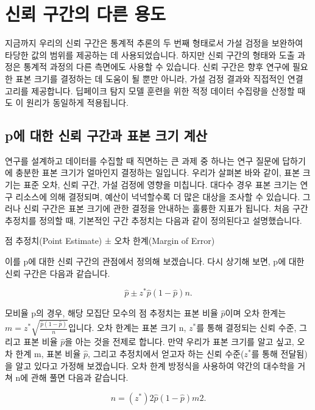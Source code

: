 \documentclass[
]{scrbook}
\begin{document}
\section{신뢰 구간의 다른
용도}\label{uxc2e0uxb8b0-uxad6cuxac04uxc758-uxb2e4uxb978-uxc6a9uxb3c4}

지금까지 우리의 신뢰 구간은 통계적 추론의 두 번째 형태로서 가설 검정을
보완하여 타당한 값의 범위를 제공하는 데 사용되었습니다. 하지만 신뢰
구간의 형태와 도출 과정은 통계적 과정의 다른 측면에도 사용할 수
있습니다. 신뢰 구간은 향후 연구에 필요한 표본 크기를 결정하는 데 도움이
될 뿐만 아니라, 가설 검정 결과와 직접적인 연결 고리를 제공합니다.
딥페이크 탐지 모델 훈련을 위한 적정 데이터 수집량을 산정할 때도 이
원리가 동일하게 적용됩니다.

\subsection{p에 대한 신뢰 구간과 표본 크기
계산}\label{puxc5d0-uxb300uxd55c-uxc2e0uxb8b0-uxad6cuxac04uxacfc-uxd45cuxbcf8-uxd06cuxae30-uxacc4uxc0b0}

연구를 설계하고 데이터를 수집할 때 직면하는 큰 과제 중 하나는 연구
질문에 답하기에 충분한 표본 크기가 얼마인지 결정하는 일입니다. 우리가
살펴본 바와 같이, 표본 크기는 표준 오차, 신뢰 구간, 가설 검정에 영향을
미칩니다. 대다수 경우 표본 크기는 연구 리소스에 의해 결정되며, 예산이
넉넉할수록 더 많은 대상을 조사할 수 있습니다. 그러나 신뢰 구간은 표본
크기에 관한 결정을 안내하는 훌륭한 지표가 됩니다. 처음 구간 추정치를
정의할 때, 기본적인 구간 추정치는 다음과 같이 정의된다고 설명했습니다.

점 추정치(Point Estimate) ± 오차 한계(Margin of Error)

이를 p에 대한 신뢰 구간의 관점에서 정의해 보겠습니다. 다시 상기해 보면,
p에 대한 신뢰 구간은 다음과 같습니다.

\[
\hat{p}±z^*\hat{p}(1-\hat{p})n.
\]

모비율 p의 경우, 해당 모집단 모수의 점 추정치는 표본 비율
\(\hat{p}\)이며 오차 한계는
\(m = z^* \sqrt{\frac{\hat{p}(1-\hat{p})}{n}}\)입니다. 오차 한계는 표본
크기 n, \(z^*\)를 통해 결정되는 신뢰 수준, 그리고 표본 비율
\(\hat{p}\)을 아는 것을 전제로 합니다. 만약 우리가 표본 크기를 알고
싶고, 오차 한계 m, 표본 비율 \(\hat{p}\), 그리고 추정치에서 얻고자 하는
신뢰 수준(\(z^*\)를 통해 전달됨)을 알고 있다고 가정해 보겠습니다. 오차
한계 방정식을 사용하여 약간의 대수학을 거쳐 n에 관해 풀면 다음과
같습니다.

\[
n=(z^*)2\hat{p}(1-\hat{p})m2.
\]
\end{document}
